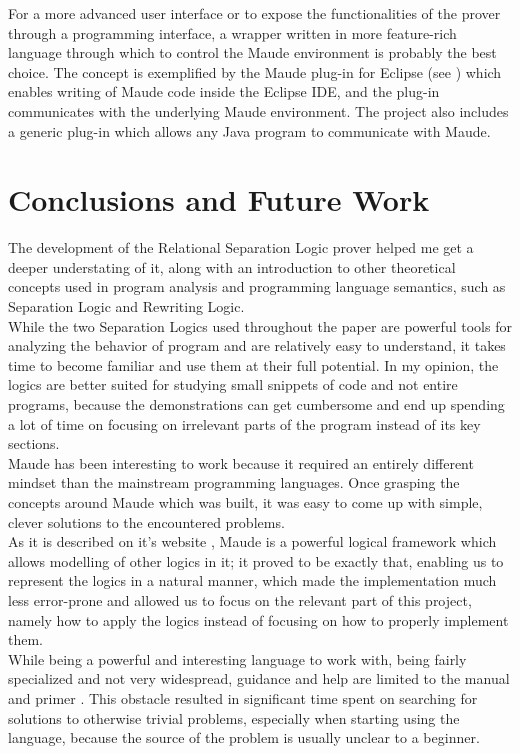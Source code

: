 \documentclass[12pt,a4paper]{article}
\begin{document}
For a more advanced user interface or to expose the  functionalities of the prover through a programming interface, a wrapper written in more feature-rich language through which to control the Maude environment is probably the best choice. The concept is exemplified by the Maude plug-in for Eclipse (see \cite{maudeEclipsePLugin}) which enables writing of Maude code inside the Eclipse IDE, and the plug-in communicates with the underlying Maude environment. The project also includes a generic plug-in which allows any Java program to communicate with Maude.
\section*{Conclusions and Future Work}
The development of the Relational Separation Logic prover helped me get a deeper understating of it, along with an introduction to other theoretical concepts used in program analysis and programming language semantics, such as Separation Logic and Rewriting Logic.
\\

While the two Separation Logics used throughout the paper are powerful tools for analyzing the behavior of program and are relatively easy to understand, it takes time to become familiar and use them at their full potential. In my opinion, the logics are better suited for studying small snippets of code and not entire programs, because the demonstrations can get cumbersome and end up spending a lot of time on focusing on irrelevant parts of the program instead of its key sections. 
\\

Maude has been interesting to work because it required an entirely different mindset than the mainstream programming languages. Once grasping the concepts around Maude which was built, it was easy to come up with simple, clever solutions to the encountered problems. \\
As it is described on it's website \cite{maudesite}, Maude is a powerful logical framework which allows modelling of other logics in it; it proved to be exactly that, enabling us to represent the logics in a natural manner, which made the implementation much less error-prone and allowed us to focus on the relevant part of this project, namely how to apply the logics instead of focusing on how to properly implement them.
\\

While being a powerful and interesting language to work with, being fairly specialized and not very widespread, guidance and help are limited to the manual \cite{manual} and primer \cite{maudeprimer}. This obstacle resulted in significant time spent on searching for solutions to otherwise trivial problems, especially when starting using the language, because the source of the problem is usually unclear to a beginner. 
\\
\end{document}

